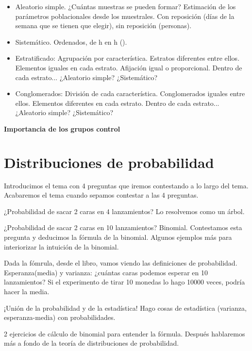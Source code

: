 \begin{itemize}
    \item Aleatorio simple.
        \subitem ¿Cuántas muestras se pueden formar?
        \subitem Estimación de los parámetros poblacionales desde los muestrales.
        \subitem Con reposición (días de la semana que se tienen que elegir), sin reposición (personas).
    \item Sistemático.
    \subitem Ordenados, de h en h ().
    \item Estratificado:
    \subitem Agrupación por característica. Estratos diferentes entre ellos. Elementos iguales en cada estrato.
    \subitem Afijación igual o proporcional.
    \subitem Dentro de cada estrato... ¿Aleatorio simple? ¿Sistemático?
    \item Conglomerados:
    \subitem División de cada característica. Conglomerados iguales entre ellos. Elementos diferentes en cada estrato.
    \subitem Dentro de cada estrato... ¿Aleatorio simple? ¿Sistemático?
\end{itemize}


\textbf{Importancia de los grupos control}

\section{Distribuciones de probabilidad}

Introducimos el tema con 4 preguntas que iremos contestando a lo largo del tema. Acabaremos el tema cuando sepamos contestar a las 4 preguntas.

¿Probabilidad de sacar 2 caras en 4 lanzamientos? Lo resolvemos como un árbol.

¿Probabilidad de sacar 2 caras en 10 lanzamientos? Binomial. Contestamos esta pregunta y deducimos la fórmula de la binomial. Algunos ejemplos más para interiorizar la intuición de la binomial.



Dada la fómrula, desde el libro, vamos viendo las definiciones de probabilidad. Esperanza(media) y varianza: ¿cuántas caras podemos esperar en 10 lanzamientos? Si el experimento de tirar 10 monedas lo hago 10000 veces, podría hacer la media. 

¡Unión de la probabilidad y de la estadística! Hago cosas de estadística (varianza, esperanza-media) con probabilidades.

2 ejercicios de cálculo de binomial para entender la fórmula. Después hablaremos más a fondo de la teoría de distribuciones de probabilidad.

